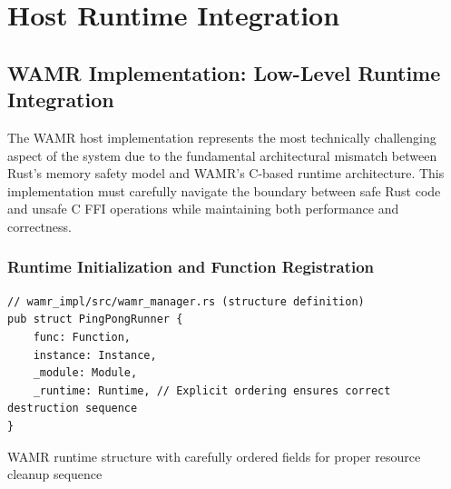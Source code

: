 \section{Host Runtime Integration}
\label{sec:host-runtime-integration}

\subsection{WAMR Implementation: Low-Level Runtime Integration}

The WAMR host implementation represents the most technically challenging aspect of the system due to the fundamental architectural mismatch between Rust's memory safety model and WAMR's C-based runtime architecture. This implementation must carefully navigate the boundary between safe Rust code and unsafe C FFI operations while maintaining both performance and correctness.

\subsubsection{Runtime Initialization and Function Registration}

\begin{listing}[H]
\begin{verbatim}
// wamr_impl/src/wamr_manager.rs (structure definition)
pub struct PingPongRunner {
    func: Function,
    instance: Instance,
    _module: Module,
    _runtime: Runtime, // Explicit ordering ensures correct destruction sequence
}
\end{verbatim}
\caption{WAMR runtime structure with carefully ordered fields for proper resource cleanup sequence}
\label{lst:wamr-structure}
\end{listing}

